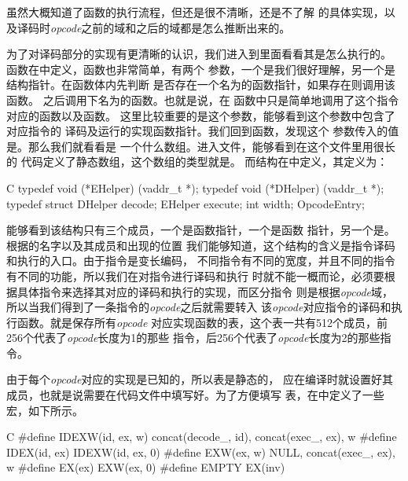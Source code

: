 虽然大概知道了函数的执行流程，但还是很不清晰，还是不了解
的具体实现，以及译码时\emph{opcode}之前的域和之后的域都是怎么推断出来的。

为了对译码部分的实现有更清晰的认识，我们进入到里面看看其是怎么执行的。
函数在中定义，函数也非常简单，有两个
参数，一个是\pc 我们很好理解，另一个是结构指针。在函数体内先判断
是否存在一个名为的函数指针，如果存在则调用该函数。
之后调用下名为的函数。也就是说，在
函数中只是简单地调用了这个指令对应的函数以及函数。
这里比较重要的是这个参数，能够看到这个参数中包含了对应指令的
译码及运行的实现函数指针。我们回到函数，发现这个
参数传入的值是。那么我们就看看是
一个什么数组。进入文件，能够看到在这个文件里用很长的
代码定义了静态数组，这个数组的类型就是。
而结构在中定义，其定义为：
\begin{codes*}{C}
typedef void (*EHelper) (vaddr_t *);
typedef void (*DHelper) (vaddr_t *);
typedef struct {
  DHelper decode;
  EHelper execute;
  int width;
} OpcodeEntry;
\end{codes*}

能够看到该结构只有三个成员，一个是函数指针，一个是函数
指针，另一个是。根据的名字以及其成员和出现的位置
我们能够知道，这个结构的含义是指令译码和执行的入口。由于\arch 指令是变长编码，
不同指令有不同的宽度，并且不同的指令有不同的功能，所以我们在对指令进行译码和执行
时就不能一概而论，必须要根据具体指令来选择其对应的译码和执行的实现，而区分指令
则是根据\emph{opcode}域，所以当我们得到了一条指令的\emph{opcode}之后就需要转入
该\emph{opcode}对应指令的译码和执行函数。就是保存所有\emph{opcode}
对应实现函数的表，这个表一共有512个成员，前256个代表了\emph{opcode}长度为1的那些
指令，后256个代表了\emph{opcode}长度为2的那些指令。

由于每个\emph{opcode}对应的实现是已知的，所以表是静态的，
应在编译时就设置好其成员，也就是说需要在代码文件中填写好。为了方便填写
表，在中定义了一些宏，如下所示。
\begin{codes*}{C}
#define IDEXW(id, ex, w) {concat(decode_, id), concat(exec_, ex), w}
#define IDEX(id, ex)     IDEXW(id, ex, 0)
#define EXW(ex, w)       {NULL, concat(exec_, ex), w}
#define EX(ex)           EXW(ex, 0)
#define EMPTY            EX(inv)
\end{codes*}

